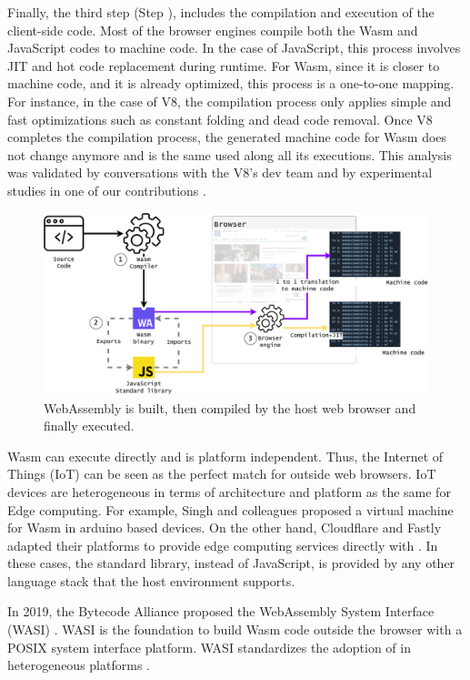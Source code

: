 Finally, the third step (Step ), includes the compilation and execution of the client-side code. Most of the browser engines compile both the Wasm  and JavaScript codes to machine code. In the case of JavaScript, this process involves JIT and hot code replacement during runtime. For Wasm, since it is closer to machine code, and it is already optimized, this process is a one-to-one mapping. For instance, in the case of V8, the compilation process only applies simple and fast optimizations such as constant folding and dead code removal. Once V8 completes the compilation process, the generated machine code for Wasm does not change anymore and is the same used along all its executions. This analysis was validated by conversations with the V8's dev team and by experimental studies in one of our contributions \cite{CROW}.  

\begin{figure}[h]
    \centering
    \includegraphics[width=\linewidth]{diagrams/wasm_workflow.pdf}
    \caption{WebAssembly is built, then compiled by the host web browser and finally executed. }
    \label{diagrams:sota:wasm}
\end{figure}

Wasm can execute directly and is platform independent.
Thus, the Internet of Things (IoT) can be seen as the perfect match for \wasm \cite{Narayan2021Swivel,Sledge} outside web browsers.
IoT devices are heterogeneous in terms of architecture and platform as the same for Edge computing.
For example, Singh and colleagues \cite{WARDuino2019} proposed a virtual machine for Wasm in arduino based devices.
On the other hand, Cloudflare and Fastly adapted their platforms to provide edge computing services directly with \wasm. 
In these cases, the standard library, instead of JavaScript, is provided by any other language stack that the host environment supports.

In 2019, the Bytecode Alliance \cite{bytecodealliance} proposed the WebAssembly System Interface (WASI) \cite{WASI}. 
WASI is the foundation to build Wasm code outside the browser with a POSIX system interface platform. 
WASI standardizes the adoption of \wasm in heterogeneous platforms \cite{bryant2020webassembly}. 

